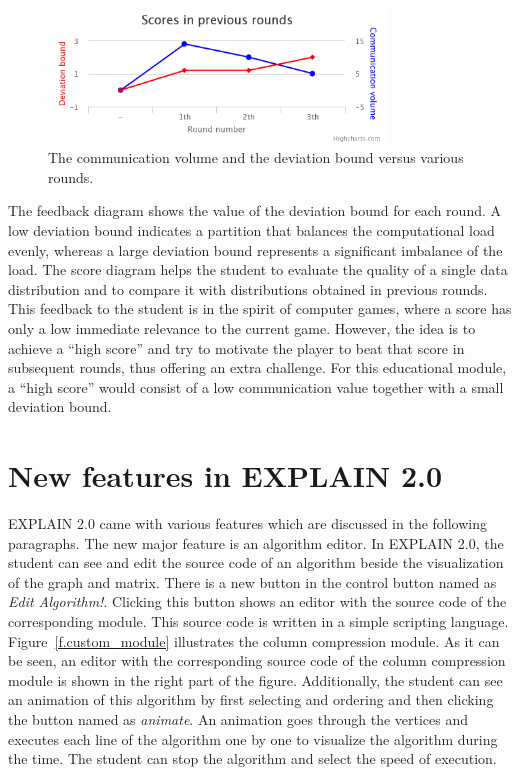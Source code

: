 \documentclass[12pt, twoside,a4paper,toc=bibliography]{scrbook}
\begin{document}
\begin{figure}
\centering
\includegraphics[width=0.8\textwidth]{chart}
\caption{The communication volume and the deviation bound versus various rounds.}
\label{f.score}
\end{figure}
The feedback diagram shows the value of the deviation bound for each round.
A low deviation bound
indicates a partition that balances the computational load evenly, whereas a large
deviation bound represents a significant imbalance of the load. The score diagram helps the
student to evaluate the quality of a single data distribution and to compare it with
distributions obtained in previous rounds. This feedback to the student is in
the spirit of computer games, where a score has only a low immediate relevance to the
current game. However, the idea is to achieve a ``high score'' and try to motivate the
player to beat that score in subsequent rounds, thus offering an extra challenge. For
this educational module, a ``high score'' would consist of a low communication value
together with a small deviation bound.

\section{New features in EXPLAIN 2.0}
\label{s.alg.edit}
EXPLAIN 2.0 came with various features which are
discussed in the following paragraphs. 
The new major feature is an algorithm editor.
In EXPLAIN 2.0, the student can see and edit the source code of an algorithm
beside the visualization of the graph and matrix.
There is a new button in the control button named as \textit{Edit Algorithm!}.
Clicking this button shows an editor with the source code of the corresponding module.
This source code is written in a simple scripting language.
Figure~\ref{f.custom_module} illustrates the column compression module.
As it can be seen, an editor with the corresponding source code of 
the column compression module is shown in the right part of the figure.
Additionally, the student can see an animation of this algorithm
by first selecting and ordering and then clicking the button 
named as \textit{animate}.
An animation goes through the vertices and executes each line of the algorithm
one by one to visualize the algorithm during the time.
The student can stop the algorithm and select the speed of execution.
\end{document}

